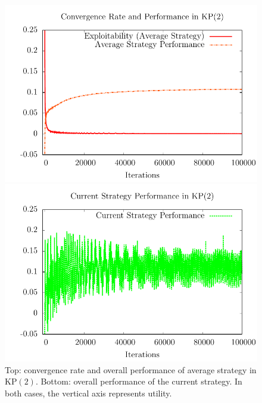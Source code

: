 \documentclass{aamas2014}
\begin{document}
\begin{figure}[t]
\begin{center}
\hspace{-0.5cm}\includegraphics[scale=0.7]{figs/sfrd2-conv} 

\hspace{-0.5cm}\includegraphics[scale=0.7]{figs/sfrd2-curperf}
\end{center}
\caption{Top: convergence rate and overall performance of average strategy in KP$(2)$. Bottom: overall performance
of the current strategy. In both cases, the vertical axis represents utility. \label{fig:sfrd2-conv}}
\end{figure}

\end{document}

